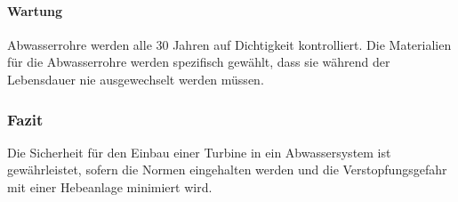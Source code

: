 \paragraph{Wartung}
Abwasserrohre werden alle 30 Jahren auf Dichtigkeit kontrolliert. Die Materialien für die Abwasserrohre werden spezifisch gewählt, dass sie während der Lebensdauer nie ausgewechselt werden müssen.

\subsubsection{Fazit}

Die Sicherheit für den Einbau einer Turbine in ein Abwassersystem ist gewährleistet, sofern die Normen eingehalten werden und die Verstopfungsgefahr mit einer Hebeanlage minimiert wird. 

\clearpage 





